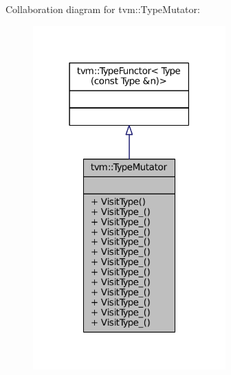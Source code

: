 Collaboration diagram for tvm\+:\+:Type\+Mutator\+:
\nopagebreak
\begin{figure}[H]
\begin{center}
\leavevmode
\includegraphics[width=210pt]{classtvm_1_1TypeMutator__coll__graph}
\end{center}
\end{figure}
